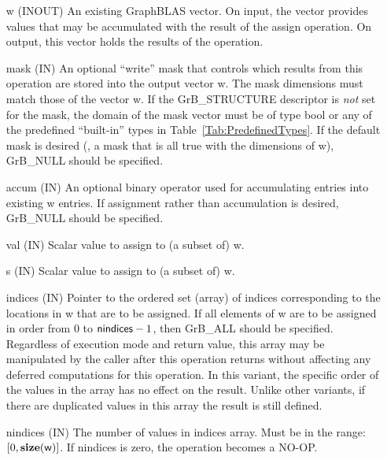 \begin{itemize}[leftmargin=1.1in]
    \item[{\sf w}]    ({\sf INOUT}) An existing GraphBLAS vector.  On input,
    the vector provides values that may be accumulated with the result of the
    assign operation.  On output, this vector holds the results of the
    operation.

    \item[{\sf mask}] ({\sf IN}) An optional ``write'' mask that controls which
    results from this operation are stored into the output vector {\sf w}. The 
    mask dimensions must match those of the vector {\sf w}. If the 
    {\sf GrB\_STRUCTURE} descriptor is {\em not} set for the mask, the domain of the
    {\sf mask} vector must be of type {\sf bool} or any of the predefined 
    ``built-in'' types in Table~\ref{Tab:PredefinedTypes}.  If the default
    mask is desired (\ie, a mask that is all {\sf true} with the dimensions of {\sf w}), 
    {\sf GrB\_NULL} should be specified.

    \item[{\sf accum}] ({\sf IN}) An optional binary operator used for accumulating
    entries into existing {\sf w} entries. If assignment rather than accumulation is
    desired, {\sf GrB\_NULL} should be specified.

    \item[{\sf val}]    ({\sf IN}) Scalar value to assign to (a subset of) {\sf w}.

    \item[{\sf s}]    ({\sf IN}) Scalar value to assign to (a subset of) {\sf w}.

    \item[{\sf indices}]  ({\sf IN}) Pointer to the ordered set (array) of 
    indices corresponding to the locations in {\sf w} that are to be assigned.  
    If all elements of {\sf w} are to be assigned in order from $0$ to 
    ${\sf nindices} - 1$, then {\sf GrB\_ALL} should be specified.  Regardless of 
    execution mode and return value, this array may be manipulated by the caller
    after this operation returns without affecting any deferred computations for 
    this operation.  
    In this variant, the specific order of the values in the
    array has no effect on the result.  Unlike other variants, if there are 
    duplicated values in this array the result is still defined.
    
    \item[{\sf nindices}] ({\sf IN}) The number of values in {\sf indices} array.
    Must be in the range: $[0, \bold{size}({\sf w})]$.  If {\sf nindices}
    is zero, the operation becomes a NO-OP.


\end{itemize}
